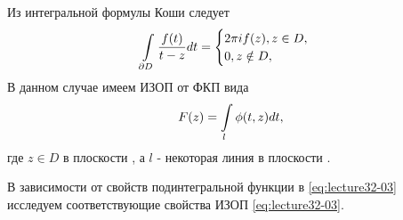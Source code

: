 
\begin{col-answer-preambule}
\end{col-answer-preambule}
Из интегральной формулы Коши следует
\begin{align*}
  \int\limits_{\partial D}\dfrac{f(t)}{t - z}dt =
  \begin{cases}
    2\pi if(z), z \in D,\\
    0, z \notin D,
  \end{cases}
\end{align*}
В данном случае имеем ИЗОП от ФКП вида
\begin{equation}
  \label{eq:lecture32-03}
  F(z) = \int\limits_l\phi(t, z)dt,
\end{equation}
где $z \in D$ в плоскости , а $l$ - некоторая линия в плоскости .

В зависимости от свойств подинтегральной функции в \eqref{eq:lecture32-03} исследуем соответствующие
свойства ИЗОП \eqref{eq:lecture32-03}.

